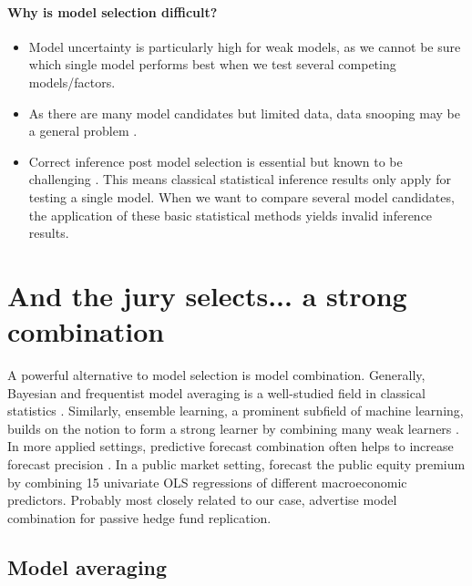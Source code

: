 \documentclass[12pt]{article}
\begin{document}
\paragraph{Why is model selection difficult?}

\begin{itemize}
	\item Model uncertainty is particularly high for weak models, as we cannot be sure which single model performs best when we test several competing models/factors.
	\item As there are many model candidates but limited data, data snooping may be a general problem \citep{W00}. 
	\item Correct inference post model selection is essential but known to be challenging \citep{BLP19}. This means classical statistical inference results only apply for testing a single model. When we want to compare several model candidates, the application of these basic statistical methods yields invalid inference results.
\end{itemize}



\section{And the jury selects... a strong combination}
\label{sec:model_combination}

A powerful alternative to model selection is model combination.
Generally, Bayesian and frequentist model averaging is a well-studied field in classical statistics \citep{H14,M15}.
Similarly, ensemble learning, a prominent subfield of machine learning, builds on the notion to form a strong learner by combining many weak learners \citep{B12}.
In more applied settings, predictive forecast combination often helps to increase forecast precision \citep{HL10}.
In a public market setting, \cite{RSZ10} forecast the public equity premium by combining 15 univariate OLS regressions of different macroeconomic predictors.
Probably most closely related to our case, \cite{OST17} advertise model combination for passive hedge fund replication.


\subsection{Model averaging}
\label{sec:model_averaging}
\end{document}
